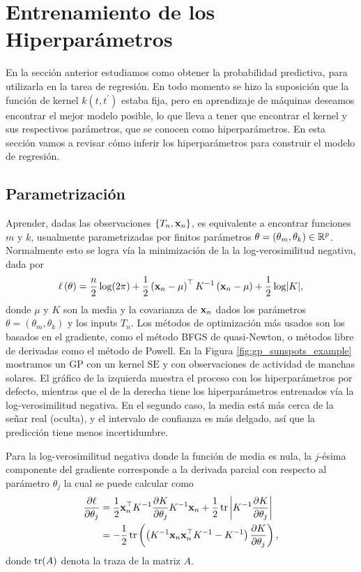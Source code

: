 \section{Entrenamiento de los Hiperparámetros}

En la sección anterior estudiamos como obtener la probabilidad predictiva, para utilizarla en la tarea de regresión. En todo momento se hizo la suposición que la función de kernel \(k(t, t^{\prime})\) estaba fija, pero en aprendizaje de máquinas deseamos encontrar el mejor modelo posible, lo que lleva a tener que encontrar el kernel y sus respectivos parámetros, que se conocen como hiperparámetros. En esta sección vamos a revisar cómo inferir los hiperparámetros para construir el modelo de regresión.

\subsection{Parametrización}
Aprender, dadas las observaciones \(\{T_n, \mathbf{x}_n\}\), es equivalente a encontrar funciones \(m\) y \(k\), usualmente parametrizadas por finitos parámetros \(\theta = (\theta_m, \theta_k) \in \mathbb{R}^p\). Normalmente esto se logra vía la minimización de la la log-verosimilitud negativa, dada por
\[\ell \left(\theta\right) = \frac{n}{2}\log(2\pi) + \frac{1}{2} \left(\mathbf{x}_n - \mu \right)^{\top} K^{-1} \left(\mathbf{x}_n-\mu \right) + \frac{1}{2} \log \lvert K\rvert,\]
donde \(\mu\) y \(K\) son la media y la covarianza de \(\mathbf{x}_n\) dados los parámetros \(\theta = (\theta_m, \theta_k)\) y los inputs \(T_n\). Los métodos de optimización más usados son los basados en el gradiente, como el método BFGS de quasi-Newton, o métodos libre de derivadas como el método de Powell. En la Figura \ref{fig:gp_sunspots_example} mostramos un GP con un kernel \(\mathrm{SE}\) y con observaciones de actividad de manchas solares. El gráfico de la izquierda muestra el proceso con los hiperparámetros por defecto, mientras que el de la derecha tiene los hiperparámetros entrenados vía la log-verosimilitud negativa. En el segundo caso, la media está más cerca de la señar real (oculta), y el intervalo de confianza es más delgado, así que la predicción tiene menos incertidumbre.

Para la log-verosimilitud negativa donde la función de media es nula, la \(j\)-ésima componente del gradiente corresponde a la derivada parcial con respecto al parámetro \(\theta_j\) la cual se puede calcular como
\begin{align*}
	\pdv{\ell}{\theta_j}	&= \frac{1}{2}\mathbf{x}_n^{\top} K^{-1} \pdv{K}{\theta_j} K^{-1} \mathbf{x}_n + \frac{1}{2} \tr \left\vert K^{-1} \pdv{K}{\theta_j} \right\vert \\
							&= -\frac{1}{2} \tr\left(\left(K^{-1} \mathbf{x}_n \mathbf{x}_n^{\top} K^{-1} - K^{-1}\right) \pdv{K}{\theta_j}\right),
\end{align*}
donde \(\tr(A)\) denota la traza de la matriz \(A\).

